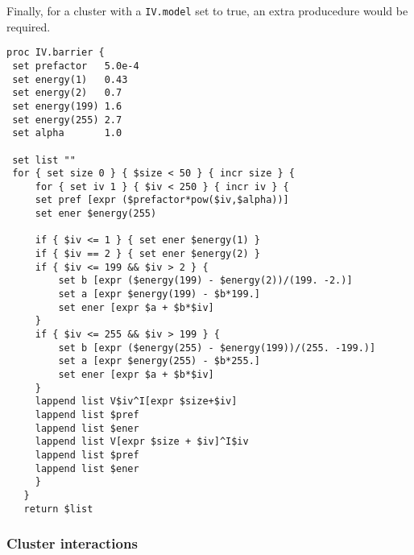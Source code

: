 Finally, for a cluster with a {\tt IV.model} set to true, an extra producedure would be required.

\begin{lstlisting}
proc IV.barrier {
 set prefactor   5.0e-4
 set energy(1)   0.43
 set energy(2)   0.7
 set energy(199) 1.6
 set energy(255) 2.7
 set alpha       1.0
 
 set list ""
 for { set size 0 } { $size < 50 } { incr size } {
     for { set iv 1 } { $iv < 250 } { incr iv } {
	 set pref [expr ($prefactor*pow($iv,$alpha))]
	 set ener $energy(255)
	 
	 if { $iv <= 1 } { set ener $energy(1) }
	 if { $iv == 2 } { set ener $energy(2) }
	 if { $iv <= 199 && $iv > 2 } {
	     set b [expr ($energy(199) - $energy(2))/(199. -2.)]
	     set a [expr $energy(199) - $b*199.]
	     set ener [expr $a + $b*$iv]
	 }
	 if { $iv <= 255 && $iv > 199 } {
	     set b [expr ($energy(255) - $energy(199))/(255. -199.)]
	     set a [expr $energy(255) - $b*255.]
	     set ener [expr $a + $b*$iv]
	 }	
	 lappend list V$iv^I[expr $size+$iv]
	 lappend list $pref
	 lappend list $ener
	 lappend list V[expr $size + $iv]^I$iv
	 lappend list $pref
	 lappend list $ener
     }
   }
   return $list
\end{lstlisting}

\subsubsection{Cluster interactions}

